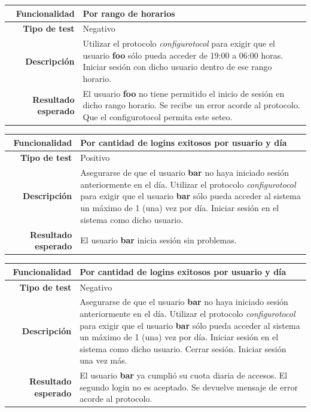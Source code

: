 \documentclass[a4paper,10pt]{article}
\begin{document}
\begin{center}
  \begin{tabular}{|r|p{12.5cm}|}
    \hline
    \textbf{Funcionalidad}	&	Por rango de horarios\\
    \hline
    \textbf{Tipo de test}	&	Negativo\\
    \hline
    \textbf{Descripción}	&	Utilizar el protocolo \textit{configurotocol} para exigir que el usuario
					\textbf{foo} sólo pueda acceder de 19:00 a 06:00 horas. Iniciar sesión con
					dicho usuario dentro de ese rango horario.\\
    \hline
    \textbf{Resultado esperado}	&	El usuario \textbf{foo} no tiene permitido el inicio de sesión en dicho
					rango horario. Se recibe un error acorde al protocolo. Que el configurotocol permita este seteo.\\
    \hline   
  \end{tabular}
\end{center}

\begin{center}
  \begin{tabular}{|r|p{12.5cm}|}
    \hline
    \textbf{Funcionalidad}	&	Por cantidad de logins exitosos por usuario y día\\
    \hline
    \textbf{Tipo de test}	&	Positivo\\
    \hline
    \textbf{Descripción}	&	Asegurarse de que el usuario \textbf{bar} no haya iniciado sesión
					anteriormente en el día.
					Utilizar el protocolo \textit{configurotocol} para exigir que el usuario
					\textbf{bar} sólo pueda acceder al sistema un máximo de 1 (una) vez
					por día. Iniciar sesión en el sistema como dicho usuario.\\
    \hline
    \textbf{Resultado esperado}	&	El usuario \textbf{bar} inicia sesión sin problemas.\\
    \hline   
  \end{tabular}
\end{center}

\begin{center}
  \begin{tabular}{|r|p{12.5cm}|}
    \hline
    \textbf{Funcionalidad}	&	Por cantidad de logins exitosos por usuario y día\\
    \hline
    \textbf{Tipo de test}	&	Negativo\\
    \hline
    \textbf{Descripción}	&	Asegurarse de que el usuario \textbf{bar} no haya iniciado sesión
					anteriormente en el día.
					Utilizar el protocolo \textit{configurotocol} para exigir que el usuario
					\textbf{bar} sólo pueda acceder al sistema un máximo de 1 (una) vez
					por día. Iniciar sesión en el sistema como dicho usuario. Cerrar sesión.
					Iniciar sesión una vez más.\\
    \hline
    \textbf{Resultado esperado}	&	El usuario \textbf{bar} ya cumplió su cuota diaria de accesos.
					El segundo login no es aceptado. Se devuelve mensaje de error acorde al protocolo.\\
    \hline   
  \end{tabular}
\end{center}
\end{document}
